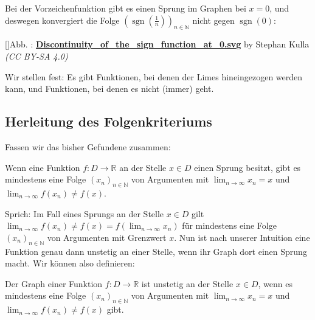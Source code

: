 \documentclass[fontsize=9pt,
               parskip=half-,
               DIV=14,
               listof=chapterentry,
               tocflat]{scrbook}
\newcounter{imagelabel}
\begin{document}
Bei der Vorzeichenfunktion gibt es einen Sprung im Graphen bei $x=0$, und deswegen konvergiert die Folge $\left(\operatorname {sgn} \left({\tfrac {1}{n}}\right)\right)_{n\in \mathbb {N} }$ nicht gegen $\operatorname {sgn}(0)$:

[]{Abb. : \protect\href{https://commons.wikimedia.org/wiki/File:Discontinuity_of_the_sign_function_at_0.svg}{\textbf{Discontinuity\allowbreak\_of\allowbreak\_the\allowbreak\_sign\allowbreak\_function\allowbreak\_at\allowbreak\_0.svg}} by Stephan Kulla \textit{(CC BY-SA 4.0)}}\begin{center}
\end{center}

Wir stellen fest: Es gibt Funktionen, bei denen der Limes hineingezogen werden kann, und Funktionen, bei denen es nicht (immer) geht.

\subsection{Herleitung des Folgenkriteriums}

Fassen wir das bisher Gefundene zusammen:

\begin{importantparagraph*}
Wenn eine Funktion $f:D\to \mathbb {R} $ an der Stelle $x\in D$ einen Sprung besitzt, gibt es mindestens eine Folge $(x_{n})_{n\in \mathbb {N} }$ von Argumenten mit $\lim _{n\to \infty }x_{n}=x$ und $\lim _{n\to \infty }f(x_{n})\neq f(x)$.

\end{importantparagraph*}

Sprich: Im Fall eines Sprungs an der Stelle $x\in D$ gilt $\lim _{n\to \infty }f(x_{n})\neq f(x)=f\left(\lim _{n\to \infty }x_{n}\right)$ für mindestens eine Folge $(x_{n})_{n\in \mathbb {N} }$ von Argumenten mit Grenzwert $x$. Nun ist nach unserer Intuition eine Funktion genau dann unstetig an einer Stelle, wenn ihr Graph dort einen Sprung macht. Wir können also definieren:

\begin{importantparagraph*}
Der Graph einer Funktion $f:D\to \mathbb {R} $ ist unstetig an der Stelle $x\in D$, wenn es mindestens eine Folge $(x_{n})_{n\in \mathbb {N} }$ von Argumenten mit $\lim _{n\to \infty }x_{n}=x$ und $\lim _{n\to \infty }f(x_{n})\neq f(x)$ gibt.

\end{importantparagraph*}
\end{document}
